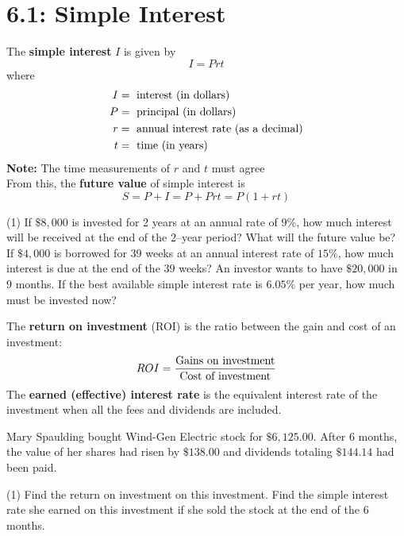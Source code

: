 \documentclass[../mathNotesPreamble]{subfiles}
\begin{document}
  \section{6.1: Simple Interest}
  \begin{defn*}
    The \textbf{simple interest} $I$ is given by
      \[I=Prt\]
    where
      \begin{align*}
        I&=\textnormal{ interest (in dollars) }\\
        P&=\textnormal{ principal (in dollars) }\\
        r&=\textnormal{ annual interest rate (as a decimal)}\\
        t&=\textnormal{ time (in years)}
      \end{align*}
    \textbf{Note: } The time measurements of $r$ and $t$ must agree\\
    
    From this, the \textbf{future value} of simple interest is
      \[S=P+I=P+Prt=P(1+rt)\]
  \end{defn*}
  \pagebreak
  
  \begin{ex*}\mbox{}
    \begin{extasks}[after-item-skip=\stretch{1}](1)
      \task If $\$8,000$ is invested for 2 years at an annual rate of $9\%$, how much interest will be received at the end of the $2$--year period? What will the future value be?
      \task If $\$4,000$ is borrowed for 39 weeks at an annual interest rate of $15\%$, how much interest is due at the end of the $39$ weeks? 
      \task An investor wants to have $\$20,000$ in $9$ months. If the best available simple interest rate is $6.05\%$ per year, how much must be invested now?
    \end{extasks}
  \end{ex*}
  \pagebreak

  \begin{defn*}
    The \textbf{return on investment} (ROI) is the ratio between the gain and cost of an investment:
      \[ROI=\frac{\textnormal{Gains on investment}}{\textnormal{Cost of investment}}\]
    The \textbf{earned (effective) interest rate} is the equivalent interest rate of the investment when all the fees and dividends are included.
  \end{defn*}
  \begin{ex*}
    Mary Spaulding bought Wind-Gen Electric stock for $\$6,125.00$. After $6$ months, the value of her shares had risen by $\$138.00$ and dividends totaling $\$144.14$ had been paid.
  \end{ex*}
  \begin{extasks}[after-item-skip=\stretch{1}](1)
    \task Find the return on investment on this investment.
    \task Find the simple interest rate she earned on this investment if she sold the stock at the end of the $6$ months.
  \end{extasks}
  \pagebreak
  
\end{document}
